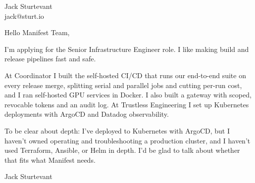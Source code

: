 \documentclass[11pt]{article}
\begin{document}
\raggedright

{\namefont\fontsize{20pt}{24pt}\selectfont Jack Sturtevant}\\[-0.3em]
jack@sturt.io

\vspace{1.2em}

Hello Manifest Team,

I'm applying for the Senior Infrastructure Engineer role. I like making build and release pipelines fast and safe.

At Coordinator I built the self-hosted CI/CD that runs our end-to-end suite on every release merge, splitting serial and parallel jobs and cutting per-run cost, and I ran self-hosted GPU services in Docker. I also built a gateway with scoped, revocable tokens and an audit log. At Trustless Engineering I set up Kubernetes deployments with ArgoCD and Datadog observability.

To be clear about depth: I've deployed to Kubernetes with ArgoCD, but I haven't owned operating and troubleshooting a production cluster, and I haven't used Terraform, Ansible, or Helm in depth. I'd be glad to talk about whether that fits what Manifest needs.

\vspace{0.6em}
Jack Sturtevant
\end{document}
